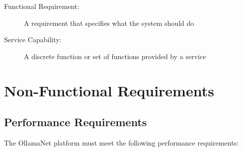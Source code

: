 \begin{terminology}
\begin{description}
    \item[Functional Requirement:] A requirement that specifies what the system should do
    \item[Service Capability:] A discrete function or set of functions provided by a service
\end{description}
\end{terminology}

\section{Non-Functional Requirements}

\subsection{Performance Requirements}

The OllamaNet platform must meet the following performance requirements:

